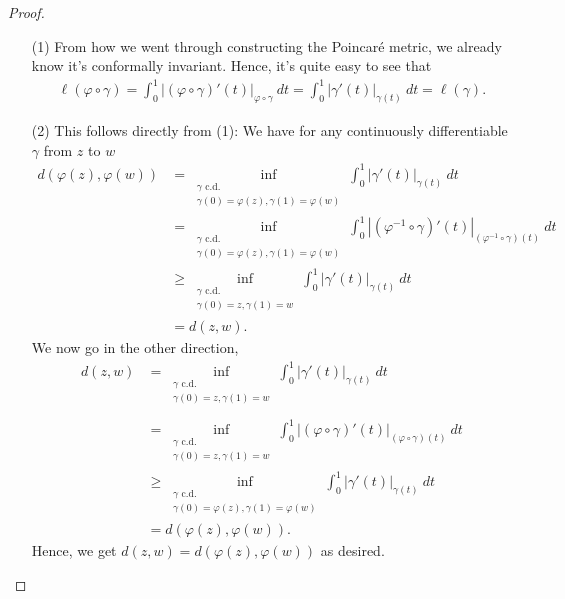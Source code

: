 \documentclass[10pt]{article}
\theoremstyle{plain}
\begin{document}
			\begin{proof} ~
				\begin{itemize}
					\item[(1)] From how we went through constructing the Poincaré metric, we already know it's conformally invariant. Hence, it's quite easy to see that
						\begin{align*}
							\ell(\varphi \circ \gamma) = \int_0^1 |(\varphi \circ \gamma)'(t)|_{\varphi \circ \gamma} \ dt = \int_0^1 |\gamma'(t)|_{\gamma(t)} \ dt = \ell(\gamma).
						\end{align*}
					
					\item[(2)] This follows directly from (1): We have for any continuously differentiable $\gamma$ from $z$ to $w$ 
						\begin{align*}
							d(\varphi(z), \varphi(w)) &= \inf_{\substack{\gamma \text{ c.d.} \\ \gamma(0) = \varphi(z), \gamma(1) = \varphi(w)}} \int_0^1 |\gamma'(t)|_{\gamma(t)} \ dt \\
							&= \inf_{\substack{\gamma \text{ c.d.} \\ \gamma(0) = \varphi(z), \gamma(1) = \varphi(w)}} \int_0^1 |(\varphi^{-1} \circ \gamma)'(t)|_{(\varphi^{-1} \circ \gamma)(t)} \ dt \\ 
							&\geq \inf_{\substack{\gamma \text{ c.d.} \\ \gamma(0) = z, \gamma(1) = w}} \int_0^1 |\gamma'(t)|_{\gamma(t)} \ dt \\
							&= d(z, w). 
						\end{align*}
					We now go in the other direction,
						\begin{align*}
							d(z, w) &= \inf_{\substack{\gamma \text{ c.d.} \\ \gamma(0) = z, \gamma(1) = w}} \int_0^1 |\gamma'(t)|_{\gamma(t)} \ dt \\
							 \\
							 &= \inf_{\substack{\gamma \text{ c.d.} \\ \gamma(0) = z, \gamma(1) = w}} \int_0^1 |(\varphi \circ \gamma)'(t)|_{(\varphi \circ \gamma)(t)} \ dt \\
							 &\geq \inf_{\substack{\gamma \text{ c.d.} \\ \gamma(0) = \varphi(z), \gamma(1) = \varphi(w)}} \int_0^1 |\gamma'(t)|_{\gamma(t)} \ dt \\
							 &= d(\varphi(z), \varphi(w)).
 						\end{align*}
 					Hence, we get $d(z, w) = d(\varphi(z), \varphi(w))$ as desired. 
				\end{itemize}
			\end{proof}
		
\end{document}

